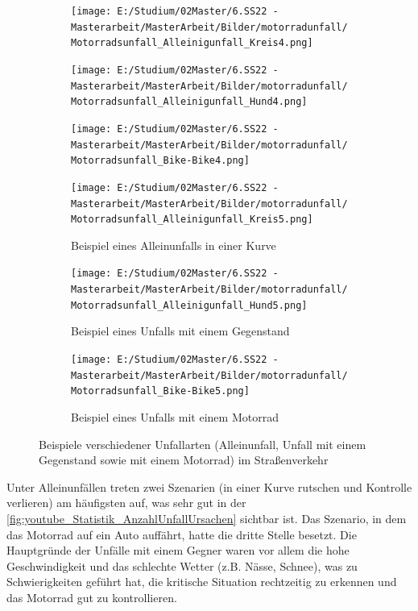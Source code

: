 \begin{figure}[htpb]
	\begin{subfigure}{0.28\textwidth}
		\centering
		\texttt{[image: E:/Studium/02Master/6.SS22 - Masterarbeit/MasterArbeit/Bilder/motorradunfall/Motorradsunfall\_Alleinigunfall\_Kreis4.png]}
	\end{subfigure}
	\begin{subfigure}{0.28\textwidth}
		\centering
		\texttt{[image: E:/Studium/02Master/6.SS22 - Masterarbeit/MasterArbeit/Bilder/motorradunfall/Motorradsunfall\_Alleinigunfall\_Hund4.png]}
	\end{subfigure}
	\begin{subfigure}{0.28\textwidth}
		\centering
		\texttt{[image: E:/Studium/02Master/6.SS22 - Masterarbeit/MasterArbeit/Bilder/motorradunfall/Motorradsunfall\_Bike-Bike4.png]}
	\end{subfigure}
	\begin{subfigure}{0.28\textwidth}
		\centering
		\texttt{[image: E:/Studium/02Master/6.SS22 - Masterarbeit/MasterArbeit/Bilder/motorradunfall/Motorradsunfall\_Alleinigunfall\_Kreis5.png]}
		\caption{Beispiel eines Alleinunfalls in einer Kurve}
		\label{fig:Motorradsunfall_Alleinigunfall_Kreis}
	\end{subfigure}
	\begin{subfigure}{0.28\textwidth}
		\centering
		\texttt{[image: E:/Studium/02Master/6.SS22 - Masterarbeit/MasterArbeit/Bilder/motorradunfall/Motorradsunfall\_Alleinigunfall\_Hund5.png]}
		\caption{Beispiel eines Unfalls mit einem Gegenstand}
		\label{fig:Motorradsunfall_Alleinigunfall_Hund}
	\end{subfigure}
	\begin{subfigure}{0.28\textwidth}
		\centering
		\texttt{[image: E:/Studium/02Master/6.SS22 - Masterarbeit/MasterArbeit/Bilder/motorradunfall/Motorradsunfall\_Bike-Bike5.png]}
		\caption{Beispiel eines Unfalls mit einem Motorrad}
		\label{fig:Motorradsunfall_Bike-Bike}
	\end{subfigure}
	\caption{Beispiele verschiedener Unfallarten (Alleinunfall, Unfall mit einem Gegenstand sowie mit einem Motorrad) im Straßenverkehr}
	\label{fig:MotorradsunfallBeipsiele}
\end{figure}
Unter Alleinunfällen treten zwei Szenarien (in einer Kurve rutschen und Kontrolle verlieren) am häufigsten auf, was sehr gut in der \autoref{fig:youtube_Statistik_AnzahlUnfallUrsachen} sichtbar ist. Das Szenario, in dem das Motorrad auf ein Auto auffährt, hatte die dritte Stelle besetzt. Die Hauptgründe der Unfälle mit einem Gegner waren vor allem die hohe Geschwindigkeit und das schlechte Wetter (z.B. Nässe, Schnee), was zu Schwierigkeiten geführt hat, die kritische Situation rechtzeitig zu erkennen und das Motorrad gut zu kontrollieren.

